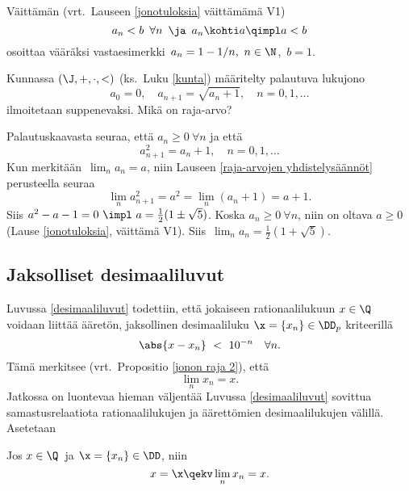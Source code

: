 \begin{Exa} Väittämän (vrt.\ Lauseen \ref{jonotuloksia} väittämämä V1) 
\[
a_n < b\,\ \forall n\,\ \ja\,\ a_n \kohti a \qimpl a<b
\]
osoittaa vääräksi vastaesimerkki $\,a_n=1-1/n,\ n\in\N$, $\,b=1$. \loppu
\end{Exa}
\begin{Exa} Kunnassa $(\J,+,\cdot,<)$ (ks.\ Luku \ref{kunta}) määritelty palautuva lukujono
\[
a_0=0, \quad a_{n+1}=\sqrt{a_n + 1}, \quad n=0,1,\ldots
\]
ilmoitetaan suppenevaksi. Mikä on raja-arvo?
\end{Exa}
\ratk Palautuskaavasta seuraa, että $a_n \ge 0\ \forall n$ ja että
\[
a_{n+1}^2 = a_n + 1, \quad n=0,1,\ldots
\]
Kun merkitään $\,\lim_n a_n=a$, niin Lauseen \ref{raja-arvojen yhdistelysäännöt} perusteella
seuraa
\[
\lim_n a_{n+1}^2 = a^2 = \lim_n(a_n + 1) = a+1.
\]
Siis $a^2-a-1=0\ \impl\ a=\tfrac{1}{2}(1\pm\sqrt{5})$. Koska $a_n \ge 0\ \forall n$, niin
on oltava $a \ge 0$ (Lause \ref{jonotuloksia}, väittämä V1). Siis 
$\,\lim_n a_n =\tfrac{1}{2}(1+\sqrt{5})$. \loppu

\subsection*{Jaksolliset desimaaliluvut}
%

Luvussa \ref{desimaaliluvut} todettiin, että jokaiseen rationaalilukuun $x \in \Q$ voidaan
liittää ääretön, jaksollinen desimaaliluku $\x = \{x_n\} \in \DD_p$ kriteerillä
\[
\abs{x - x_n}\ <\ 10^{-n} \quad \forall n.
\]
Tämä merkitsee (vrt.\ Propositio \ref{jonon raja 2}), että
\[
\lim_n x_n = x.
\]
Jatkossa on luontevaa hieman väljentää Luvussa \ref{desimaaliluvut} sovittua samastusrelaatiota
rationaalilukujen ja äärettömien desimaalilukujen välillä. Asetetaan

\begin{Def} \label{samastus QD} Jos $x\in\Q\,$ ja $\x = \{x_n\} \in \DD$, niin
\[
x=\x \qekv \lim_n x_n = x.
\] 
\end{Def}

